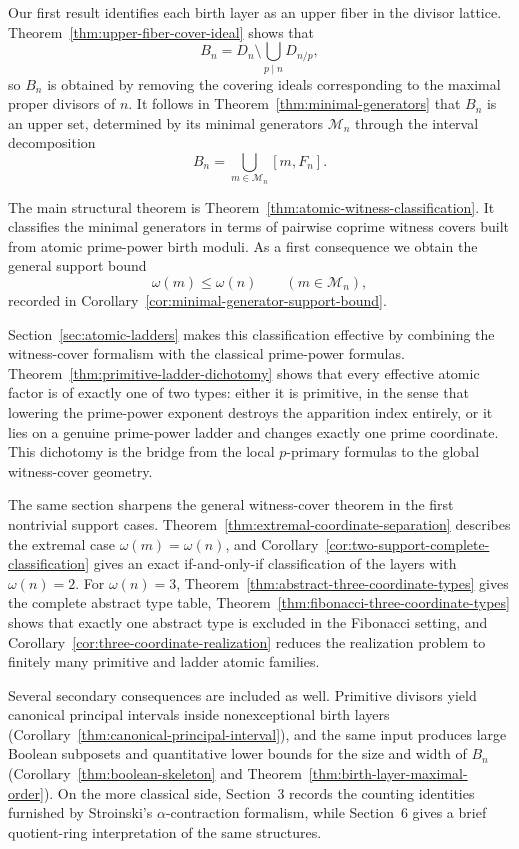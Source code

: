 \documentclass[11pt,letterpaper]{article}
\numberwithin{equation}{section}
\theoremstyle{plain}
\theoremstyle{definition}
\theoremstyle{remark}
\begin{document}
Our first result identifies each birth layer as an upper fiber in the divisor
lattice. Theorem~\ref{thm:upper-fiber-cover-ideal} shows that
\[
B_n=D_n\setminus \bigcup_{p\mid n} D_{n/p},
\]
so $B_n$ is obtained by removing the covering ideals corresponding to the
maximal proper divisors of $n$. It follows in
Theorem~\ref{thm:minimal-generators} that $B_n$ is an upper set, determined by
its minimal generators $\mathcal M_n$ through the interval decomposition
\[
B_n=\bigcup_{m\in\mathcal M_n}[m,F_n].
\]

The main structural theorem is
Theorem~\ref{thm:atomic-witness-classification}. It classifies the minimal
generators in terms of pairwise coprime witness covers built from atomic
prime-power birth moduli. As a first consequence we obtain the general support
bound
\[
\omega(m)\le \omega(n)
\qquad
(m\in\mathcal M_n),
\]
recorded in Corollary~\ref{cor:minimal-generator-support-bound}.

Section~\ref{sec:atomic-ladders} makes this classification effective by
combining the witness-cover formalism with the classical prime-power formulas.
Theorem~\ref{thm:primitive-ladder-dichotomy} shows that every effective atomic
factor is of exactly one of two types: either it is primitive, in the sense
that lowering the prime-power exponent destroys the apparition index entirely,
or it lies on a genuine prime-power ladder and changes exactly one prime
coordinate. This dichotomy is the bridge from the local $p$-primary formulas
to the global witness-cover geometry.

The same section sharpens the general witness-cover theorem in the first
nontrivial support cases. Theorem~\ref{thm:extremal-coordinate-separation}
describes the extremal case $\omega(m)=\omega(n)$, and
Corollary~\ref{cor:two-support-complete-classification} gives an exact
if-and-only-if classification of the layers with $\omega(n)=2$. For
$\omega(n)=3$, Theorem~\ref{thm:abstract-three-coordinate-types} gives the
complete abstract type table, Theorem~\ref{thm:fibonacci-three-coordinate-types}
shows that exactly one abstract type is excluded in the Fibonacci setting, and
Corollary~\ref{cor:three-coordinate-realization} reduces the realization
problem to finitely many primitive and ladder atomic families.

Several secondary consequences are included as well. Primitive divisors yield
canonical principal intervals inside nonexceptional birth layers
(Corollary~\ref{thm:canonical-principal-interval}), and the same input produces
large Boolean subposets and quantitative lower bounds for the size and width of
$B_n$ (Corollary~\ref{thm:boolean-skeleton} and
Theorem~\ref{thm:birth-layer-maximal-order}). On the more classical side,
Section~3 records the counting identities furnished by Stroinski's
$\alpha$-contraction formalism, while Section~6 gives a brief quotient-ring
interpretation of the same structures.
\end{document}
